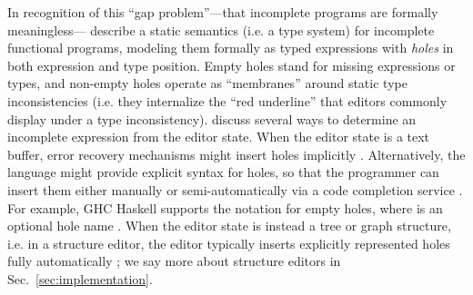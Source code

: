 
In recognition of this ``{gap problem}''---that incomplete programs are formally meaningless---\citet{popl-paper} describe a static semantics (i.e. a type system) for incomplete 
functional programs, modeling them formally as typed expressions with \emph{holes} in 
both expression and type position. 
Empty holes stand for missing expressions or types,
and non-empty holes operate as ``membranes'' around static type inconsistencies 
(i.e. they internalize the ``red underline'' that editors commonly display under a type inconsistency).
\citet{HazelnutSNAPL} discuss several ways to determine an incomplete expression from the editor state. When the editor state is a text buffer, error recovery mechanisms might insert holes implicitly \cite{DBLP:journals/siamcomp/AhoP72,charles1991practical,graham1979practical,DBLP:conf/oopsla/KatsJNV09}. Alternatively, the language might provide explicit syntax for holes, so that the programmer can insert them either manually  
or semi-automatically via a code completion service \cite{Amorim2016}. For example, GHC Haskell supports the notation  for empty holes, where  is an optional hole name \cite{GHCHoles}. When the editor state is instead a tree or graph structure, i.e. in a structure editor, the editor typically inserts explicitly represented holes fully automatically \cite{popl-paper}; we say more about structure editors in Sec.~\ref{sec:implementation}.


